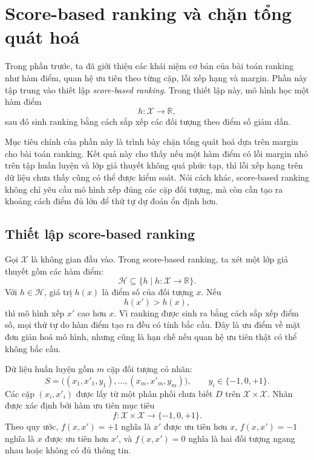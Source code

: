 \section{Score-based ranking và chặn tổng quát hoá}
\label{sec:score-based-ranking-generalization}

Trong phần trước, ta đã giới thiệu các khái niệm cơ bản của bài toán ranking như hàm điểm, quan hệ ưu tiên theo từng cặp, lỗi xếp hạng và margin. Phần này tập trung vào thiết lập \textit{score-based ranking}. Trong thiết lập này, mô hình học một hàm điểm
\[
    h:\mathcal{X}\rightarrow\mathbb{R},
\]
sau đó sinh ranking bằng cách sắp xếp các đối tượng theo điểm số giảm dần.

Mục tiêu chính của phần này là trình bày chặn tổng quát hoá dựa trên margin cho bài toán ranking. Kết quả này cho thấy nếu một hàm điểm có lỗi margin nhỏ trên tập huấn luyện và lớp giả thuyết không quá phức tạp, thì lỗi xếp hạng trên dữ liệu chưa thấy cũng có thể được kiểm soát. Nói cách khác, score-based ranking không chỉ yêu cầu mô hình xếp đúng các cặp đối tượng, mà còn cần tạo ra khoảng cách điểm đủ lớn để thứ tự dự đoán ổn định hơn.

\subsection{Thiết lập score-based ranking}

Gọi \(\mathcal{X}\) là không gian đầu vào. Trong score-based ranking, ta xét một lớp giả thuyết gồm các hàm điểm:
\[
    \mathcal{H}
    \subseteq
    \{h \mid h:\mathcal{X}\rightarrow\mathbb{R}\}.
\]
Với \(h\in\mathcal{H}\), giá trị \(h(x)\) là điểm số của đối tượng \(x\). Nếu
\[
    h(x')>h(x),
\]
thì mô hình xếp \(x'\) cao hơn \(x\). Vì ranking được sinh ra bằng cách sắp xếp điểm số, mọi thứ tự do hàm điểm tạo ra đều có tính bắc cầu. Đây là ưu điểm về mặt đơn giản hoá mô hình, nhưng cũng là hạn chế nếu quan hệ ưu tiên thật có thể không bắc cầu.

Dữ liệu huấn luyện gồm \(m\) cặp đối tượng có nhãn:
\[
    S =
    \big((x_1,x'_1,y_1),\ldots,(x_m,x'_m,y_m)\big),
    \qquad
    y_i\in\{-1,0,+1\}.
\]
Các cặp \((x_i,x'_i)\) được lấy từ một phân phối chưa biết \(D\) trên \(\mathcal{X}\times\mathcal{X}\). Nhãn được xác định bởi hàm ưu tiên mục tiêu
\[
    f:\mathcal{X}\times\mathcal{X}\rightarrow\{-1,0,+1\}.
\]
Theo quy ước, \(f(x,x')=+1\) nghĩa là \(x'\) được ưu tiên hơn \(x\), \(f(x,x')=-1\) nghĩa là \(x\) được ưu tiên hơn \(x'\), và \(f(x,x')=0\) nghĩa là hai đối tượng ngang nhau hoặc không có đủ thông tin.

